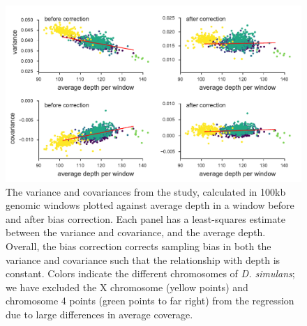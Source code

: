 \documentclass[11pt]{article}
\begin{document}
\begin{figure}[!ht]
  \centering
  \includegraphics[]{figures/barghi-correction-plot.pdf}

  \caption{The variance and covariances from the \textcite{Barghi2019-qy}
    study, calculated in 100kb genomic windows plotted against average depth in
    a window before and after bias correction.  Each panel has a least-squares
    estimate between the variance and covariance, and the average depth.
    Overall, the bias correction corrects sampling bias in both the variance
    and covariance such that the relationship with depth is constant. Colors
    indicate the different chromosomes of \emph{D. simulans}; we have excluded
  the X chromosome (yellow points) and chromosome 4 points (green points to far
right) from the regression due to large differences in average coverage.}

  \label{suppfig:barghi-correction}
\end{figure}

\clearpage
\end{document}
